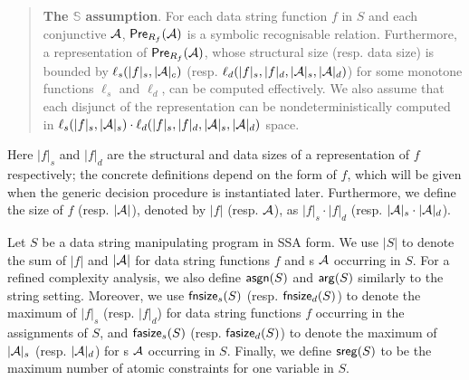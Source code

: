 \begin{quote}
{\bf The $\mathbb{S}$\prerec{} assumption}. For each data string function $f$ in $S$ and each conjunctive \SA{} $\mathcal{A}$,  $\textsf{Pre}_{R_f}(\mathcal{A})$ is a symbolic recognisable relation. Furthermore, 
a representation of $\textsf{Pre}_{R_f}(\mathcal{A})$, whose structural size (resp. data size) is bounded by  $\ell_s(|f|_s, |\mathcal{A}|_c)$ (resp. $\ell_d(|f|_s,  |f|_d, |\mathcal{A}|_s, |\mathcal{A}|_d)$) for some monotone functions $\ell_s$ and $\ell_d$, can be computed effectively. We also assume that each disjunct of the representation can be nondeterministically computed in $\ell_s(|f|_s, |\mathcal{A}|_s) \cdot \ell_d(|f|_s,  |f|_d, |\mathcal{A}|_s,  |\mathcal{A}|_d)$ space.
%
\end{quote} 
%
Here $|f|_s$ and $|f|_d$ are the structural and data sizes of a representation of $f$ respectively; the concrete definitions depend on the form of $f$, which will be given when the generic decision procedure is instantiated later. Furthermore, we define the size of $f$ (resp. $|\mathcal{A}|$), denoted by $|f|$ (resp. $\mathcal{A}$), as $|f|_s \cdot |f|_d$ (resp. $|\mathcal{A}|_s \cdot |\mathcal{A}|_d$).

Let $S$ be a data string manipulating program in SSA form.  We use $|S|$ to denote the sum of $|f|$ and $|\mathcal{A}|$ for data string functions $f$ and \SA{}s $\mathcal{A}$ occurring in $S$.  
For a refined complexity analysis, we also define $\mathsf{asgn}(S)$ and $\mathsf{arg}(S)$ similarly to the string setting. Moreover, we use $\mathsf{fnsize}_s(S)$ (resp. $\mathsf{fnsize}_d(S)$) to denote the maximum of $|f|_s$ (resp. $|f|_d$) for data string functions $f$ occurring in the assignments of $S$, and $\mathsf{fasize}_s(S)$ (resp. $\mathsf{fasize}_d(S)$) to denote the maximum of $|\mathcal{A}|_s$ (resp. $|\mathcal{A}|_d$) for \SA{}s $\mathcal{A}$ occurring in $S$. Finally, we define $\mathsf{sreg}(S)$ to be the maximum number of atomic \SA{} constraints for one variable in $S$.





